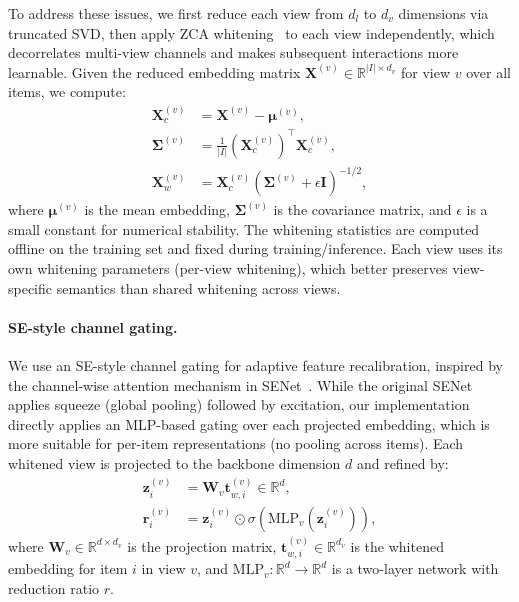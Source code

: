 To address these issues, we first reduce each \llm view from $d_l$ to $d_v$
dimensions via truncated SVD, then apply ZCA whitening~\cite{kessy2018zca} to each view
independently, which decorrelates multi-view channels and makes
subsequent interactions more learnable.
Given the reduced embedding matrix $\mathbf{X}^{(v)} \in \mathbb{R}^{|I| \times d_v}$
for view $v$ over all items, we compute:
\begin{align}
  \mathbf{X}_c^{(v)} &= \mathbf{X}^{(v)} - \boldsymbol{\mu}^{(v)}, \\
  \boldsymbol{\Sigma}^{(v)} &= \frac{1}{|I|}(\mathbf{X}_c^{(v)})^\top \mathbf{X}_c^{(v)}, \\
  \mathbf{X}_w^{(v)} &= \mathbf{X}_c^{(v)} (\boldsymbol{\Sigma}^{(v)} + \epsilon \mathbf{I})^{-1/2},
\end{align}
where $\boldsymbol{\mu}^{(v)}$ is the mean embedding, $\boldsymbol{\Sigma}^{(v)}$
is the covariance matrix, and $\epsilon$ is a small constant for numerical
stability. The whitening statistics are computed offline on the training set
and fixed during training/inference. Each view uses its own whitening
parameters (per-view whitening), which better preserves view-specific
semantics than shared whitening across views.

\paragraph{SE-style channel gating.}
We use an SE-style channel gating for adaptive feature
recalibration, inspired by the channel-wise attention mechanism
in SENet~\cite{hu2018senet}. While the original SENet applies
squeeze (global pooling) followed by excitation, our
implementation directly applies an MLP-based gating over each
projected embedding, which is more suitable for per-item
representations (no pooling across items). Each whitened view
is projected to the backbone dimension $d$ and refined by:
\begin{align}
  \mathbf{z}_i^{(v)} &= \mathbf{W}_v \mathbf{t}_{w,i}^{(v)} \in \mathbb{R}^d,\\
  \mathbf{r}_i^{(v)} &= \mathbf{z}_i^{(v)} \odot \sigma(\mathrm{MLP}_v(\mathbf{z}_i^{(v)})),
\end{align}
where $\mathbf{W}_v \in \mathbb{R}^{d \times d_v}$ is the projection matrix,
$\mathbf{t}_{w,i}^{(v)} \in \mathbb{R}^{d_v}$ is the whitened embedding for
item $i$ in view $v$, and $\mathrm{MLP}_v: \mathbb{R}^d \to \mathbb{R}^d$ is a two-layer
network with reduction ratio $r$.

